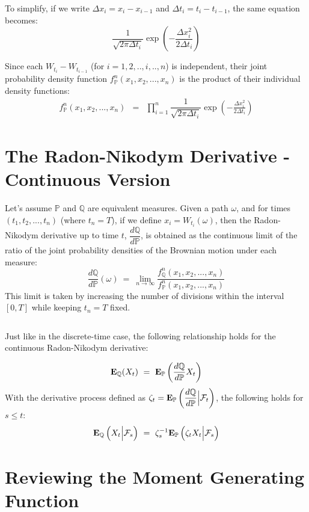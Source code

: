 \documentclass[uplatex,a4j,12pt,dvipdfmx]{jsarticle}
\begin{document}
To simplify, if we write $\Delta x_{i} = x_{i} - x_{i-1}$ and $\Delta t_{i} = t_{i} - t_{i-1}$, the same equation becomes:
%
$$
	\displaystyle
	\dfrac{1}{ \sqrt{2 \pi \Delta t_{i} } }
	\exp \left( {- \frac{ \Delta  x_{i}^{2}}{ 2 \Delta t_{i}  } } \right)
$$
%

Since each $W_{t_{i}} - W_{t_{i-1}}$ (for $i=1,2,..,i,..,n$) is independent, their joint probability density function $f^{n}_{\mathbb{P}} (x_{1} , x_{2} , ... ,x_{n})$ is the product of their individual density functions:
%
\begin{eqnarray*}
	f^{n}_{\mathbb{P}} (x_{1} , x_{2} , ... ,x_{n})
	&=&
	\prod_{i=1}^{n}
	\dfrac{1}{ \sqrt{2 \pi \Delta t_{i} } }
	\exp \left( {- \frac{ \Delta  x_{i}^{2}}{ 2 \Delta t_{i}  } } \right)
\end{eqnarray*}
%

\section{The Radon-Nikodym Derivative - Continuous Version}

Let's assume $\mathbb{P}$ and $\mathbb{Q}$ are equivalent measures.
Given a path $\omega$, and for times $(t_{1},t_{2},...,t_{n})$ (where $t_{n}=T$), if we define $x_{i} = W_{t_{i}}(\omega)$, then the Radon-Nikodym derivative up to time $t$, $\dfrac{d \mathbb{Q} }{d \mathbb{P} }$, is obtained as the continuous limit of the ratio of the joint probability densities of the Brownian motion under each measure:
$$
	\dfrac{d \mathbb{Q} }{d \mathbb{P} }(\omega)
	\ = \
	\lim_{n \to \infty}
	\dfrac{ f^{n}_{ \mathbb{Q}} (x_{1},x_{2},...,x_{n}) }{ f^{n}_{ \mathbb{P}} (x_{1},x_{2},...,x_{n}) }
$$
This limit is taken by increasing the number of divisions within the interval $[0,T]$ while keeping $t_{n}=T$ fixed.

${}$

Just like in the discrete-time case, the following relationship holds for the continuous Radon-Nikodym derivative:

$$
	{\bf E}_{\mathbb{Q}}
	(X_{t})
	\ = \
	{\bf E}_{\mathbb{P}}
	\left( \dfrac{d \mathbb{Q} }{d \mathbb{P} } X_{t} \right)
$$
With the derivative process defined as $\zeta_{t} = {\bf E}_{\mathbb{P}} \left( \dfrac{d \mathbb{Q} }{d \mathbb{P} } \Big| \mathcal{F}_{t} \right)$, the following holds for $s \leq t$:
$$
	{\bf E}_{\mathbb{Q}}
	\left( X_{t} \Big| \mathcal{F}_{s} \right)
	\ = \
	\zeta_{s}^{-1}
	{\bf E}_{\mathbb{P}}
	\left( \zeta_{t} X_{t} \Big| \mathcal{F}_{s} \right)
$$
\section{Reviewing the Moment Generating Function}
\end{document}
